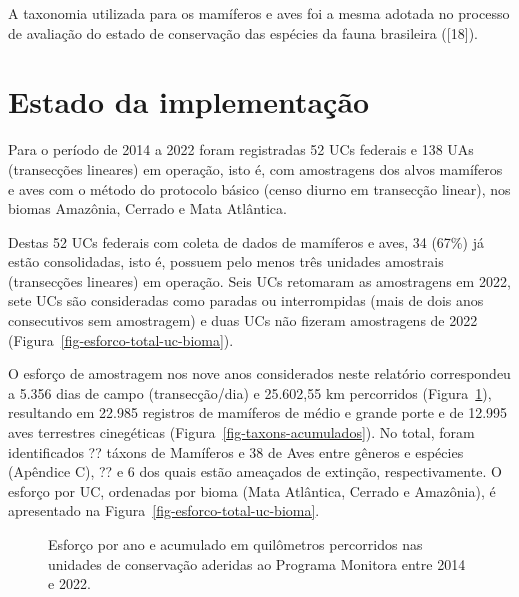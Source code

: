 \documentclass[
  letterpaper,
]{scrbook}
\begin{document}
A taxonomia utilizada para os mamíferos e aves foi a mesma adotada no
processo de avaliação do estado de conservação das espécies da fauna
brasileira ({[}18{]}).

\section{Estado da implementação}\label{estado-da-implementauxe7uxe3o-2}

Para o período de 2014 a 2022 foram registradas 52 UCs federais e 138
UAs (transecções lineares) em operação, isto é, com amostragens dos
alvos mamíferos e aves com o método do protocolo básico (censo diurno em
transecção linear), nos biomas Amazônia, Cerrado e Mata Atlântica.

Destas 52 UCs federais com coleta de dados de mamíferos e aves, 34
(67\%) já estão consolidadas, isto é, possuem pelo menos três unidades
amostrais (transecções lineares) em operação. Seis UCs retomaram as
amostragens em 2022, sete UCs são consideradas como paradas ou
interrompidas (mais de dois anos consecutivos sem amostragem) e duas UCs
não fizeram amostragens de 2022
(Figura~\ref{fig-esforco-total-uc-bioma}).

O esforço de amostragem nos nove anos considerados neste relatório
correspondeu a 5.356 dias de campo (transecção/dia) e 25.602,55 km
percorridos (Figura~\ref{fig-esforco-acumulado}), resultando em 22.985
registros de mamíferos de médio e grande porte e de 12.995 aves
terrestres cinegéticas (Figura~\ref{fig-taxons-acumulados}). No total,
foram identificados ?? táxons de Mamíferos e 38 de Aves entre gêneros e
espécies (Apêndice C), ?? e 6 dos quais estão ameaçados de extinção,
respectivamente. O esforço por UC, ordenadas por bioma (Mata Atlântica,
Cerrado e Amazônia), é apresentado na
Figura~\ref{fig-esforco-total-uc-bioma}.

\begin{figure}[H]


\caption{\label{fig-esforco-acumulado}Esforço por ano e acumulado em
quilômetros percorridos nas unidades de conservação aderidas ao Programa
Monitora entre 2014 e 2022.}

\end{figure}%
\end{document}
